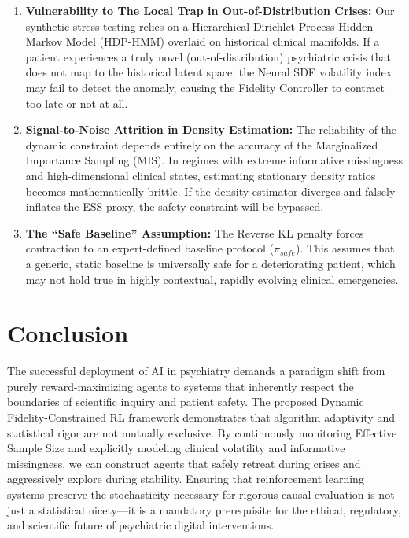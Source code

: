 \begin{enumerate}
    \item \textbf{Vulnerability to The Local Trap in Out-of-Distribution Crises:} Our synthetic stress-testing relies on a Hierarchical Dirichlet Process Hidden Markov Model (HDP-HMM) overlaid on historical clinical manifolds. If a patient experiences a truly novel (out-of-distribution) psychiatric crisis that does not map to the historical latent space, the Neural SDE volatility index may fail to detect the anomaly, causing the Fidelity Controller to contract too late or not at all.
    \item \textbf{Signal-to-Noise Attrition in Density Estimation:} The reliability of the dynamic constraint depends entirely on the accuracy of the Marginalized Importance Sampling (MIS). In regimes with extreme informative missingness and high-dimensional clinical states, estimating stationary density ratios becomes mathematically brittle. If the density estimator diverges and falsely inflates the ESS proxy, the safety constraint will be bypassed.
    \item \textbf{The ``Safe Baseline'' Assumption:} The Reverse KL penalty forces contraction to an expert-defined baseline protocol ($\pi_{safe}$). This assumes that a generic, static baseline is universally safe for a deteriorating patient, which may not hold true in highly contextual, rapidly evolving clinical emergencies.
\end{enumerate}

\section{Conclusion}

The successful deployment of AI in psychiatry demands a paradigm shift from purely reward-maximizing agents to systems that inherently respect the boundaries of scientific inquiry and patient safety. The proposed Dynamic Fidelity-Constrained RL framework demonstrates that algorithm adaptivity and statistical rigor are not mutually exclusive. By continuously monitoring Effective Sample Size and explicitly modeling clinical volatility and informative missingness, we can construct agents that safely retreat during crises and aggressively explore during stability. Ensuring that reinforcement learning systems preserve the stochasticity necessary for rigorous causal evaluation is not just a statistical nicety—it is a mandatory prerequisite for the ethical, regulatory, and scientific future of psychiatric digital interventions.

